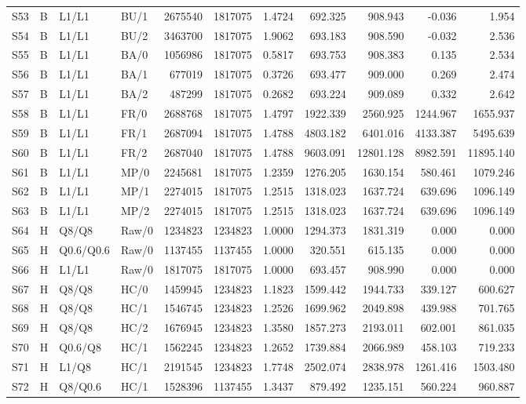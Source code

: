 \begin{longtable}{llllrrrrrrr}
S53 & B & L1/L1 & BU/1 & 2675540 & 1817075 & 1.4724 & 692.325 & 908.943 & -0.036 & 1.954\\
S54 & B & L1/L1 & BU/2 & 3463700 & 1817075 & 1.9062 & 693.183 & 908.590 & -0.032 & 2.536\\
S55 & B & L1/L1 & BA/0 & 1056986 & 1817075 & 0.5817 & 693.753 & 908.383 & 0.135 & 2.534\\
S56 & B & L1/L1 & BA/1 & 677019 & 1817075 & 0.3726 & 693.477 & 909.000 & 0.269 & 2.474\\
S57 & B & L1/L1 & BA/2 & 487299 & 1817075 & 0.2682 & 693.224 & 909.089 & 0.332 & 2.642\\
S58 & B & L1/L1 & FR/0 & 2688768 & 1817075 & 1.4797 & 1922.339 & 2560.925 & 1244.967 & 1655.937\\
S59 & B & L1/L1 & FR/1 & 2687094 & 1817075 & 1.4788 & 4803.182 & 6401.016 & 4133.387 & 5495.639\\
S60 & B & L1/L1 & FR/2 & 2687040 & 1817075 & 1.4788 & 9603.091 & 12801.128 & 8982.591 & 11895.140\\
S61 & B & L1/L1 & MP/0 & 2245681 & 1817075 & 1.2359 & 1276.205 & 1630.154 & 580.461 & 1079.246\\
S62 & B & L1/L1 & MP/1 & 2274015 & 1817075 & 1.2515 & 1318.023 & 1637.724 & 639.696 & 1096.149\\
S63 & B & L1/L1 & MP/2 & 2274015 & 1817075 & 1.2515 & 1318.023 & 1637.724 & 639.696 & 1096.149\\
S64 & H & Q8/Q8 & Raw/0 & 1234823 & 1234823 & 1.0000 & 1294.373 & 1831.319 & 0.000 & 0.000\\
S65 & H & Q0.6/Q0.6 & Raw/0 & 1137455 & 1137455 & 1.0000 & 320.551 & 615.135 & 0.000 & 0.000\\
S66 & H & L1/L1 & Raw/0 & 1817075 & 1817075 & 1.0000 & 693.457 & 908.990 & 0.000 & 0.000\\
S67 & H & Q8/Q8 & HC/0 & 1459945 & 1234823 & 1.1823 & 1599.442 & 1944.733 & 339.127 & 600.627\\
S68 & H & Q8/Q8 & HC/1 & 1546745 & 1234823 & 1.2526 & 1699.962 & 2049.898 & 439.988 & 701.765\\
S69 & H & Q8/Q8 & HC/2 & 1676945 & 1234823 & 1.3580 & 1857.273 & 2193.011 & 602.001 & 861.035\\
S70 & H & Q0.6/Q8 & HC/1 & 1562245 & 1234823 & 1.2652 & 1739.884 & 2066.989 & 458.103 & 719.233\\
S71 & H & L1/Q8 & HC/1 & 2191545 & 1234823 & 1.7748 & 2502.074 & 2838.978 & 1261.416 & 1503.480\\
S72 & H & Q8/Q0.6 & HC/1 & 1528396 & 1137455 & 1.3437 & 879.492 & 1235.151 & 560.224 & 960.887\\

\end{longtable}
